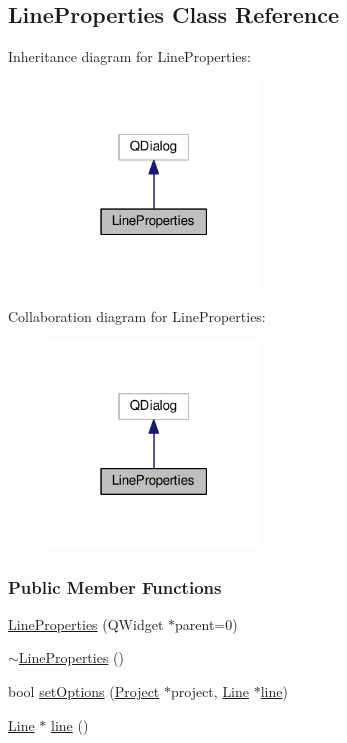 \hypertarget{class_line_properties}{}\subsection{Line\+Properties Class Reference}
\label{class_line_properties}


Inheritance diagram for Line\+Properties\+:
\nopagebreak
\begin{figure}[H]
\begin{center}
\leavevmode
\includegraphics[width=159pt]{class_line_properties__inherit__graph}
\end{center}
\end{figure}


Collaboration diagram for Line\+Properties\+:
\nopagebreak
\begin{figure}[H]
\begin{center}
\leavevmode
\includegraphics[width=159pt]{class_line_properties__coll__graph}
\end{center}
\end{figure}
\subsubsection*{Public Member Functions}
\begin{DoxyCompactItemize}
\item 
\hyperlink{class_line_properties_a0bc0d7c02db0a4ea920d040f76679fec}{Line\+Properties} (Q\+Widget $\ast$parent=0)
\item 
\hyperlink{class_line_properties_a59017a6580f2e02dc492522d9267de29}{$\sim$\+Line\+Properties} ()
\item 
bool \hyperlink{class_line_properties_ac14e88843b60ac7130a11c057306379a}{set\+Options} (\hyperlink{class_project}{Project} $\ast$project, \hyperlink{class_line}{Line} $\ast$\hyperlink{class_line_properties_ae99691d680b4df7bac3419b5588bd777}{line})
\item 
\hyperlink{class_line}{Line} $\ast$ \hyperlink{class_line_properties_ae99691d680b4df7bac3419b5588bd777}{line} ()
\end{DoxyCompactItemize}


